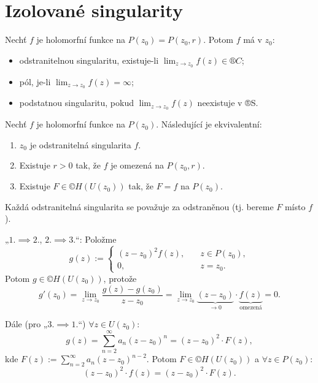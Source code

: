 \documentclass[12pt]{article}					%
\begin{document}
\section{Izolované singularity}
\begin{definice}
	Nechť $f$ je holomorfní funkce na $P(z_0) = P(z_0, r)$. Potom $f$ má v $z_0$:
	
	\begin{itemize}
		\item odstranitelnou singularitu, existuje-li $\lim_{z \rightarrow z_0} f(z) \in ®C$;
		\item pól, je-li $\lim_{z \rightarrow z_0} f(z) = ∞$;
		\item podstatnou singularitu, pokud $\lim_{z \rightarrow z_0} f(z)$ neexistuje v ®S.
	\end{itemize}

	\begin{veta}
		Nechť $f$ je holomorfní funkce na $P(z_0)$. Následující je ekvivalentní:

		\begin{enumerate}
			\item $z_0$ je odstranitelná singularita $f$.
			\item Existuje $r > 0$ tak, že $f$ je omezená na $P(z_0, r)$.
			\item Existuje $F \in ©H(U(z_0))$ tak, že $F = f$ na $P(z_0)$.
		\end{enumerate}

		\begin{poznamkain}[Úmluva]
			Každá odstranitelná singularita se považuje za odstraněnou (tj. bereme $F$ místo $f$).
		\end{poznamkain}

		\begin{dukazin}
			„$1. \implies 2.$, $2. \implies 3.$“: Položme
			$$ g(z) := \begin{cases} (z - z_0)^2 f(z),& \quad z \in P(z_0),\\ 0,& \quad z = z_0. \end{cases} $$
			Potom $g \in ©H(U(z_0))$, protože
			$$ g'(z_0) = \lim_{z \rightarrow z_0} \frac{g(z) - g(z_0)}{z - z_0} = \lim_{z \rightarrow z_0} \underbrace{(z - z_0)}_{\rightarrow 0}·\underbrace{f(z)}_{\text{omezená}} = 0. $$

			Dále (pro „$3. \implies 1.$“) $\forall z \in U(z_0)$:
			$$ g(z) = \sum_{n=2}^∞ a_n(z - z_0)^n = (z-z_0)^2·F(z), $$
			kde $F(z) := \sum_{n=2}^∞ a_n(z - z_0)^{n-2}$. Potom $F \in ©H(U(z_0))$ a $\forall z \in P(z_0)$:
			$$ (z - z_0)^2·f(z) = (z - z_0)^2·F(z). $$
		\end{dukazin}
	\end{veta}


\end{definice}
\end{document}
